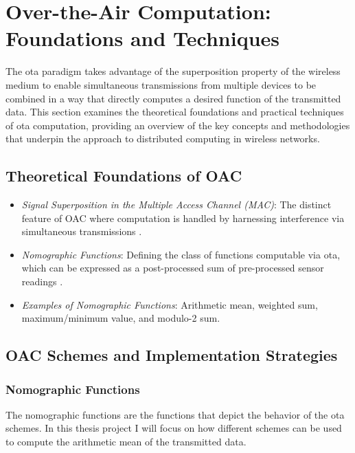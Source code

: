 \documentclass[Markos_Delaportas_1316.tex]{subfiles}
\begin{document}
\section{Over-the-Air Computation: Foundations and Techniques}
The \gls{ota} paradigm takes advantage of the superposition property of 
the wireless medium to enable simultaneous transmissions from multiple devices 
to be combined in a way that directly computes a desired function of the 
transmitted data. This section examines the theoretical foundations and 
practical techniques of \gls{ota} computation, providing an overview 
of the key concepts and methodologies that underpin the approach 
to distributed computing in wireless networks.

\subsection{Theoretical Foundations of OAC}
\begin{itemize}
    \item \textit{Signal Superposition in the Multiple Access Channel (MAC)}:
        The distinct feature of OAC where computation is handled by harnessing
        interference via simultaneous transmissions
        \cite{sahin_survey_2023,goldenbaum_robust_2013}.
    \item \textit{Nomographic Functions}: Defining the class of
        functions computable via
        \gls{ota}, which can be expressed as a post-processed sum of pre-processed
        sensor readings \cite{sahin_survey_2023,goldenbaum_analyzing_2011,
        goldenbaum_nomographic_2015,goldenbaum_robust_2013}.
    \item \textit{Examples of Nomographic Functions}: Arithmetic
        mean, weighted sum,
        maximum/minimum value, and modulo-2
        sum\cite{sahin_survey_2023,evgenidis_waveform_2025,goldenbaum_robust_2013}.
\end{itemize}
\subsection{OAC Schemes and Implementation Strategies}

    \subsubsection{Nomographic Functions}
    The nomographic functions are the functions that depict the behavior of the \gls{ota} schemes.
    In this thesis project I will focus on how different schemes can be used to compute the arithmetic 
    mean of the transmitted data.
\end{document}
